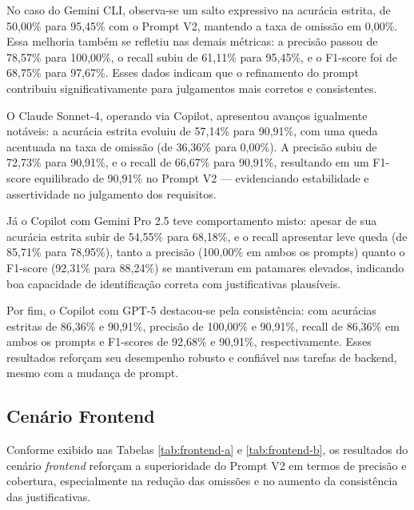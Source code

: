 No caso do Gemini CLI, observa-se um salto expressivo na acurácia estrita, de 50,00\% para 95,45\% com o Prompt V2, mantendo a taxa de omissão em 0,00\%. Essa melhoria também se refletiu nas demais métricas: a precisão passou de 78,57\% para 100,00\%, o recall subiu de 61,11\% para 95,45\%, e o F1-score foi de 68,75\% para 97,67\%. Esses dados indicam que o refinamento do prompt contribuiu significativamente para julgamentos mais corretos e consistentes.

O Claude Sonnet-4, operando via Copilot, apresentou avanços igualmente notáveis: a acurácia estrita evoluiu de 57,14\% para 90,91\%, com uma queda acentuada na taxa de omissão (de 36,36\% para 0,00\%). A precisão subiu de 72,73\% para 90,91\%, e o recall de 66,67\% para 90,91\%, resultando em um F1-score equilibrado de 90,91\% no Prompt V2 — evidenciando estabilidade e assertividade no julgamento dos requisitos.

Já o Copilot com Gemini Pro 2.5 teve comportamento misto: apesar de sua acurácia estrita subir de 54,55\% para 68,18\%, e o recall apresentar leve queda (de 85,71\% para 78,95\%), tanto a precisão (100,00\% em ambos os prompts) quanto o F1-score (92,31\% para 88,24\%) se mantiveram em patamares elevados, indicando boa capacidade de identificação correta com justificativas plausíveis.

Por fim, o Copilot com GPT-5 destacou-se pela consistência: com acurácias estritas de 86,36\% e 90,91\%, precisão de 100,00\% e 90,91\%, recall de 86,36\% em ambos os prompts e F1-scores de 92,68\% e 90,91\%, respectivamente. Esses resultados reforçam seu desempenho robusto e confiável nas tarefas de backend, mesmo com a mudança de prompt.


\subsection{Cenário Frontend}

Conforme exibido nas Tabelas \ref{tab:frontend-a} e \ref{tab:frontend-b}, os resultados do cenário \textit{frontend} reforçam a superioridade do Prompt V2 em termos de precisão e cobertura, especialmente na redução das omissões e no aumento da consistência das justificativas.

